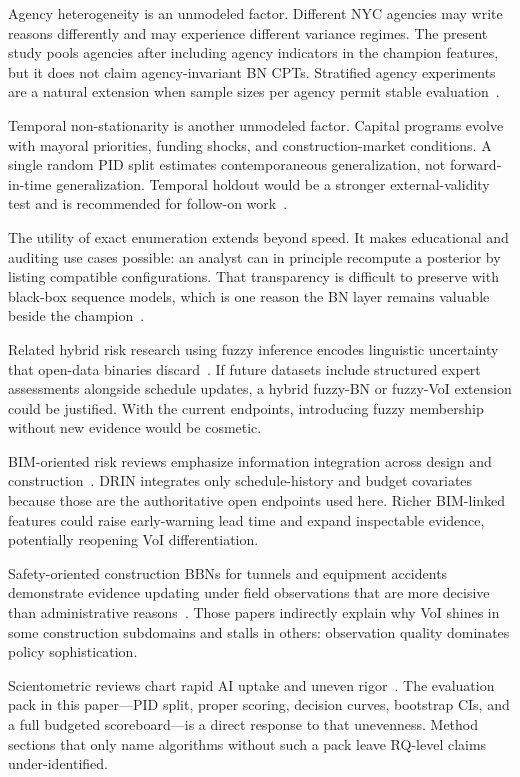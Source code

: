 Agency heterogeneity is an unmodeled factor. Different NYC agencies may write reasons differently and may experience different variance regimes. The present study pools agencies after including agency indicators in the champion features, but it does not claim agency-invariant BN CPTs. Stratified agency experiments are a natural extension when sample sizes per agency permit stable evaluation~\cite{Woldesenbet2016}.

Temporal non-stationarity is another unmodeled factor. Capital programs evolve with mayoral priorities, funding shocks, and construction-market conditions. A single random PID split estimates contemporaneous generalization, not forward-in-time generalization. Temporal holdout would be a stronger external-validity test and is recommended for follow-on work~\cite{Tagharobi2025,Love2015}.

The utility of exact enumeration extends beyond speed. It makes educational and auditing use cases possible: an analyst can in principle recompute a posterior by listing compatible configurations. That transparency is difficult to preserve with black-box sequence models, which is one reason the BN layer remains valuable beside the champion~\cite{Luu2009,Heckerman1996}.

Related hybrid risk research using fuzzy inference encodes linguistic uncertainty that open-data binaries discard~\cite{Ebrat2014,Islam2017,Qazi2016}. If future datasets include structured expert assessments alongside schedule updates, a hybrid fuzzy-BN or fuzzy-VoI extension could be justified. With the current endpoints, introducing fuzzy membership without new evidence would be cosmetic.

BIM-oriented risk reviews emphasize information integration across design and construction~\cite{Zou2017}. DRIN integrates only schedule-history and budget covariates because those are the authoritative open endpoints used here. Richer BIM-linked features could raise early-warning lead time and expand inspectable evidence, potentially reopening VoI differentiation.

Safety-oriented construction BBNs for tunnels and equipment accidents demonstrate evidence updating under field observations that are more decisive than administrative reasons~\cite{Wu2015,Wang2016,Leu2012}. Those papers indirectly explain why VoI shines in some construction subdomains and stalls in others: observation quality dominates policy sophistication.

Scientometric reviews chart rapid AI uptake and uneven rigor~\cite{Darko2020,PanYZhang2021,Abioye2021,Regona2024}. The evaluation pack in this paper---PID split, proper scoring, decision curves, bootstrap CIs, and a full budgeted scoreboard---is a direct response to that unevenness. Method sections that only name algorithms without such a pack leave RQ-level claims under-identified.

